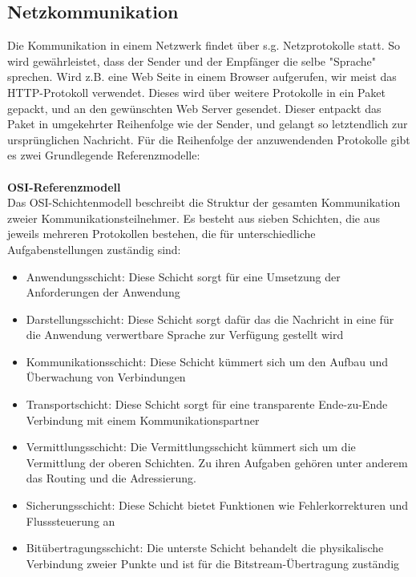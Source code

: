 \subsection{Netzkommunikation}
Die Kommunikation in einem Netzwerk findet über s.g. Netzprotokolle statt. So wird gewährleistet, dass der Sender und der Empfänger die selbe "Sprache" sprechen. Wird z.B. eine Web Seite in einem Browser aufgerufen, wir meist das HTTP-Protokoll verwendet. Dieses wird über weitere Protokolle in ein Paket gepackt, und an den gewünschten Web Server gesendet. Dieser entpackt das Paket in umgekehrter Reihenfolge wie der Sender, und gelangt so letztendlich zur ursprünglichen Nachricht\cite{tannensbaum.2012a}. Für die Reihenfolge der anzuwendenden Protokolle gibt es zwei Grundlegende Referenzmodelle:\\
\\
\noindent\textbf{OSI-Referenzmodell}\\
\noindent Das  OSI-Schichtenmodell beschreibt die Struktur der gesamten Kommunikation zweier Kommunikationsteilnehmer. Es besteht aus sieben Schichten, die aus jeweils mehreren Protokollen bestehen, die für unterschiedliche Aufgabenstellungen zuständig sind\cite{tannensbaum.2012a}:\\
\begin{itemize}
\item Anwendungsschicht: Diese Schicht sorgt für eine Umsetzung der Anforderungen der Anwendung
\item Darstellungsschicht: Diese Schicht sorgt dafür das die Nachricht in eine für die Anwendung verwertbare Sprache zur Verfügung gestellt wird
\item Kommunikationsschicht: Diese Schicht kümmert sich um den Aufbau und Überwachung von Verbindungen
\item Transportschicht: Diese Schicht sorgt für eine transparente Ende-zu-Ende Verbindung mit einem Kommunikationspartner
\item Vermittlungsschicht: Die Vermittlungsschicht kümmert sich um die Vermittlung der oberen Schichten. Zu ihren Aufgaben gehören unter anderem das Routing und die Adressierung.
\item Sicherungsschicht: Diese Schicht bietet Funktionen wie Fehlerkorrekturen und Flusssteuerung an
\item Bitübertragungsschicht: Die unterste Schicht behandelt die physikalische Verbindung zweier Punkte und ist für die Bitstream-Übertragung zuständig 
\end{itemize}

